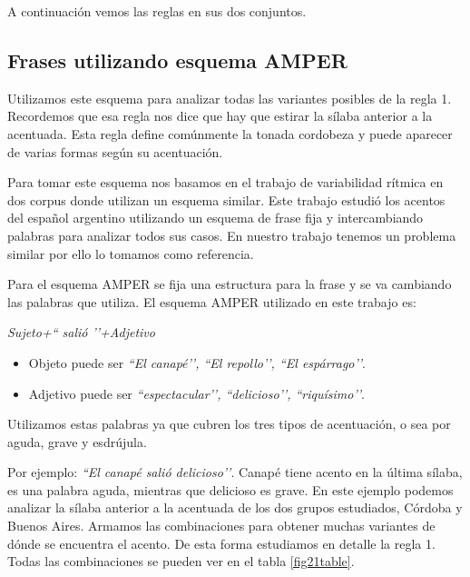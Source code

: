 A continuación vemos las reglas en sus dos conjuntos.

\subsection{Frases utilizando esquema AMPER} \label{cap:amper}


Utilizamos este esquema para analizar todas las variantes posibles de la regla 1. Recordemos que esa regla nos dice que hay que estirar la sílaba anterior a la acentuada. Esta regla define comúnmente la tonada cordobeza y puede aparecer de varias formas según su acentuación. 

Para tomar este esquema nos basamos en el trabajo de variabilidad rítmica en dos corpus \cite{amper} donde utilizan un esquema similar. Este trabajo estudió los acentos del español argentino utilizando un esquema de frase fija y intercambiando palabras para analizar todos sus casos. En nuestro trabajo tenemos un problema similar por ello lo tomamos como referencia.

Para el esquema AMPER se fija una estructura para la frase y se va cambiando las palabras que utiliza. El esquema AMPER utilizado en este trabajo es: 
\begin{center}
\textit{Sujeto+`` salió ’’+Adjetivo} 
\end{center}

\begin{itemize}
	\item Objeto puede ser \textit{``El canapé’’, ``El repollo’’, ``El espárrago’’}.
	\item Adjetivo puede ser \textit{``espectacular’’, ``delicioso’’, ``riquísimo’’}.
\end{itemize}

Utilizamos estas palabras ya que cubren los tres tipos de acentuación, o sea por aguda, grave y esdrújula. 

Por ejemplo: \textit{``El canapé salió delicioso’’}. Canapé tiene acento en la última sílaba, es una palabra aguda, mientras que delicioso es grave. En este ejemplo podemos analizar la sílaba anterior a la acentuada de los dos grupos estudiados, Córdoba y Buenos Aires. Armamos las combinaciones para obtener muchas variantes de dónde se encuentra el acento. De esta forma estudiamos en detalle la regla 1. Todas las combinaciones se pueden ver en el tabla \ref{fig21table}.

